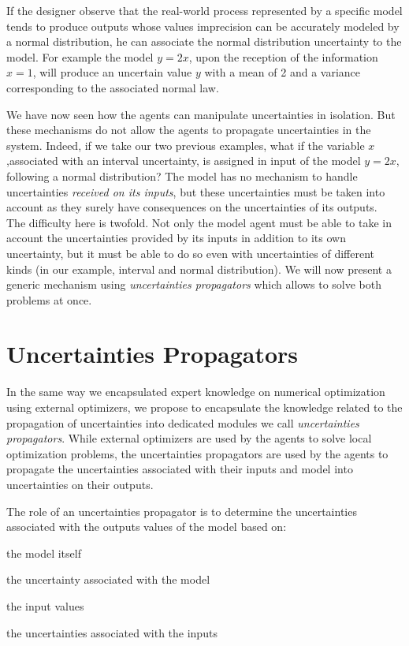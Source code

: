 If the designer observe that the real-world process represented by a specific model tends to produce outputs whose values imprecision can be accurately modeled by a normal distribution, he can associate the normal distribution uncertainty to the model. For example the model $y = 2x$, upon the reception of the information $x = 1$, will produce an uncertain value $y$ with a mean of 2 and a variance corresponding to the associated normal law.

We have now seen how the agents can manipulate uncertainties in isolation. But these mechanisms do not allow the agents to propagate uncertainties in the system. Indeed, if we take our two previous examples, what if the variable $x$ ,associated with an interval uncertainty, is assigned in input of the model $y = 2x$, following a normal distribution? The model has no mechanism to handle uncertainties \emph{received on its inputs}, but these uncertainties must be taken into account as they surely have consequences on the uncertainties of its outputs.\\
The difficulty here is twofold. Not only the model agent must be able to take in account the uncertainties provided by its inputs in addition to its own uncertainty, but it must be able to do so even with uncertainties of different kinds (in our example, interval and normal distribution). We will now present a generic mechanism using \emph{uncertainties propagators} which allows to solve both problems at once.

\section{Uncertainties Propagators}

In the same way we encapsulated expert knowledge on numerical optimization using external optimizers, we propose to encapsulate the knowledge related to the propagation of uncertainties into dedicated modules we call \emph{uncertainties propagators}. While external optimizers are used by the agents to solve local optimization problems, the uncertainties propagators are used by the agents to propagate the uncertainties associated with their inputs and model into uncertainties on their outputs.

The role of an uncertainties propagator is to determine the uncertainties associated with the outputs values of the model based on:
\begin{compactitem}
\item the model itself
\item the uncertainty associated with the model
\item the input values
\item the uncertainties associated with the inputs
\end{compactitem}

